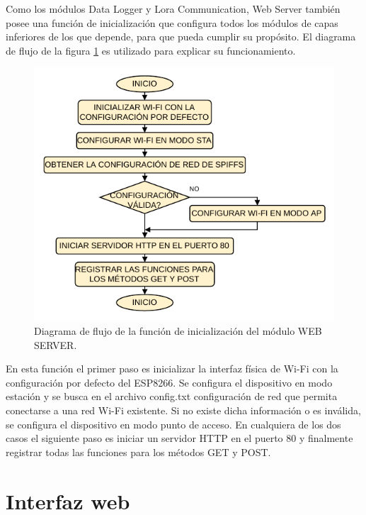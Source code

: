 Como los módulos Data Logger y Lora Communication, Web Server también posee una función de inicialización que configura todos los módulos de capas inferiores de los que depende, para que pueda cumplir su propósito. El diagrama de flujo de la figura \ref{fig:serverInit} es utilizado para explicar su funcionamiento.

\begin{figure}[h]
	\centering
	\includegraphics[scale=1]{./Figures/web_server_init.pdf}
	\caption{Diagrama de flujo de la función de inicialización del módulo WEB SERVER.}
		\label{fig:serverInit}
\end{figure}

En esta función el primer paso es inicializar la interfaz física de Wi-Fi con la configuración por defecto del ESP8266. Se configura el dispositivo en modo estación y se busca en el archivo config.txt configuración de red que permita conectarse a una red Wi-Fi existente. Si no existe dicha información o es inválida, se configura el dispositivo en modo punto de acceso. En cualquiera de los dos casos el siguiente paso es iniciar un servidor HTTP en el puerto 80 y finalmente registrar todas las funciones para los métodos GET y POST.


\section{Interfaz web}

